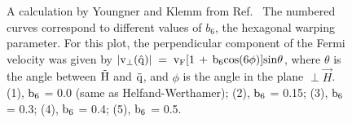 

\begin{figure}
\vspace{5in}
\caption[]{A  calculation  by Youngner  and Klemm from  Ref.~\cite{youngner80}  The
numbered curves correspond  to different values  of   $b_6$, the  hexagonal
warping parameter.  For this plot, the perpendicular component of the Fermi
velocity was given by $\rm \left| v_{\perp}(\hat{q}) \right| \; = \; v_F [1
\,  +  \, b_6 cos(6\phi)]  sin\theta$,  where $\theta$ is the angle between
$\rm \vec{H}$ and  $\rm \vec{q}$, and  $\phi$ is  the   angle in the  plane
$\perp \vec{H}$. (1), $\rm  b_6$ = 0.0   (same as  Helfand-Werthamer); (2),
$\rm b_6$ = 0.15; (3),  $\rm b_6$ = 0.3;  (4), $\rm b_6$ =  0.4;  (5), $\rm
b_6$ = 0.5.}
\label{youngner}
\end{figure}
